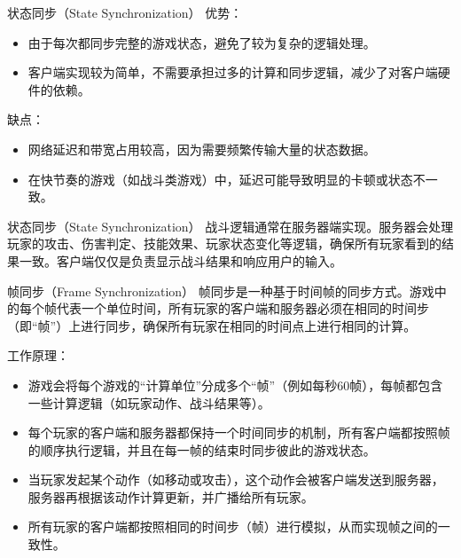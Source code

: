 \documentclass{beamer}
\begin{document}

\begin{frame}[fragile]{状态同步（State Synchronization）}
优势：
\begin{itemize}
\item 由于每次都同步完整的游戏状态，避免了较为复杂的逻辑处理。
\item 客户端实现较为简单，不需要承担过多的计算和同步逻辑，减少了对客户端硬件的依赖。
\end{itemize}

\vspace{1em}

缺点：
\begin{itemize}
\item 网络延迟和带宽占用较高，因为需要频繁传输大量的状态数据。
\item 在快节奏的游戏（如战斗类游戏）中，延迟可能导致明显的卡顿或状态不一致。
\end{itemize}
\end{frame}


\begin{frame}[fragile]{状态同步（State Synchronization）}
战斗逻辑通常在服务器端实现。服务器会处理玩家的攻击、伤害判定、技能效果、玩家状态变化等逻辑，确保所有玩家看到的结果一致。客户端仅仅是负责显示战斗结果和响应用户的输入。
\end{frame}


\begin{frame}[fragile]{帧同步（Frame Synchronization）}
帧同步是一种基于时间帧的同步方式。游戏中的每个帧代表一个单位时间，所有玩家的客户端和服务器必须在相同的时间步（即“帧”）上进行同步，确保所有玩家在相同的时间点上进行相同的计算。

\vspace{1em}

工作原理：
\begin{itemize}
\item 游戏会将每个游戏的“计算单位”分成多个“帧”（例如每秒60帧），每帧都包含一些计算逻辑（如玩家动作、战斗结果等）。
\item 每个玩家的客户端和服务器都保持一个时间同步的机制，所有客户端都按照帧的顺序执行逻辑，并且在每一帧的结束时同步彼此的游戏状态。
\item 当玩家发起某个动作（如移动或攻击），这个动作会被客户端发送到服务器，服务器再根据该动作计算更新，并广播给所有玩家。
\item 所有玩家的客户端都按照相同的时间步（帧）进行模拟，从而实现帧之间的一致性。
\end{itemize}
\end{frame}
\end{document}
